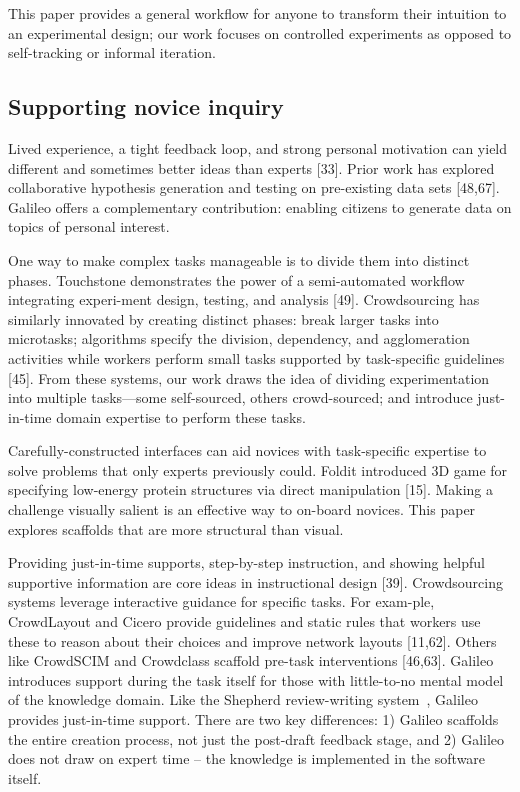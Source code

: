 This paper provides a general workflow for anyone to transform their intuition to an experimental design; our work focuses on controlled experiments as opposed to self-tracking or informal iteration.

\subsection{Supporting novice inquiry}
Lived experience, a tight feedback loop, and strong personal motivation can yield different and sometimes better ideas than experts [33]. Prior work has explored collaborative hypothesis generation and testing on pre-existing data sets [48,67]. Galileo offers a complementary contribution: enabling citizens to generate data on topics of personal interest.

One way to make complex tasks manageable is to divide them into distinct phases. Touchstone demonstrates the power of a semi-automated workflow integrating experi-ment design, testing, and analysis [49]. Crowdsourcing has similarly innovated by creating distinct phases: break larger tasks into microtasks; algorithms specify the division, dependency, and agglomeration activities while workers perform small tasks supported by task-specific guidelines [45]. From these systems, our work draws the idea of dividing experimentation into multiple tasks—some self-sourced, others crowd-sourced; and introduce just-in-time domain expertise to perform these tasks. 

Carefully-constructed interfaces can aid novices with task-specific expertise to solve problems that only experts previously could. Foldit introduced 3D game for specifying low-energy protein structures via direct manipulation [15]. Making a challenge visually salient is an effective way to on-board novices. This paper explores scaffolds that are more structural than visual.

Providing just-in-time supports, step-by-step instruction, and showing helpful supportive information are core ideas in instructional design [39]. Crowdsourcing systems leverage interactive guidance for specific tasks. For exam-ple, CrowdLayout and Cicero provide guidelines and static rules that workers use these to reason about their choices and improve network layouts [11,62]. Others like CrowdSCIM and Crowdclass scaffold pre-task interventions [46,63]. Galileo introduces support during the task itself for those with little-to-no mental model of the knowledge domain. Like the Shepherd review-writing system~\cite{dow2012shepherding}, Galileo provides just-in-time support. There are two key differences: 1) Galileo scaffolds the entire creation process, not just the post-draft feedback stage, and 2) Galileo does not draw on expert time – the knowledge is implemented in the software itself. 




